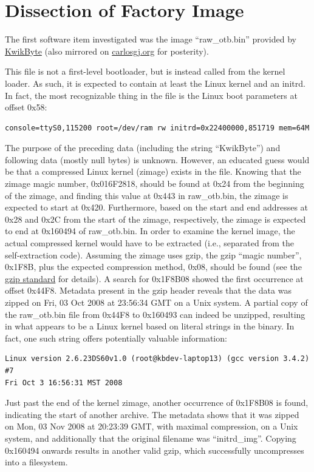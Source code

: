 \documentclass[]{article}
\begin{document}
\section{Dissection of Factory Image}
\par The first software item investigated was the image ``raw\_otb.bin'' provided by \href{http://www.kwikbyte.com/driverstation/binary/raw_otb.bin}{KwikByte} (also mirrored on \href{http://carlosgj.org/FRC/DS9260/raw_otb.bin}{carlosgj.org} for posterity).
\par This file is not a first-level bootloader, but is instead called from the kernel loader. As such, it is expected to contain at least the Linux kernel and an initrd. In fact, the most recognizable thing in the file is the Linux boot parameters at offset 0x58:
\begin{verbatim}
console=ttyS0,115200 root=/dev/ram rw initrd=0x22400000,851719 mem=64M
\end{verbatim}
\par The purpose of the preceding data (including the string ``KwikByte'') and following data (mostly null bytes) is unknown. However, an educated guess would be that a compressed Linux kernel (zimage) exists in the file. Knowing that the zimage magic number, 0x016F2818, should be found at 0x24 from the beginning of the zimage, and finding this value at 0x443 in raw\_otb.bin, the zimage is expected to start at 0x420. Furthermore, based on the start and end addresses at 0x28 and 0x2C from the start of the zimage, respectively, the zimage is expected to end at 0x160494 of raw\_otb.bin. In order to examine the kernel image, the actual compressed kernel would have to be extracted (i.e., separated from the self-extraction code). Assuming the zimage uses gzip, the gzip ``magic number'', 0x1F8B, plus the expected compression method, 0x08, should be found (see the \href{https://tools.ietf.org/html/rfc1952}{gzip standard} for details). A search for 0x1F8B08 showed the first occurrence at offset 0x44F8. Metadata present in the gzip header reveals that the data was zipped on Fri, 03 Oct 2008 at 23:56:34 GMT on a Unix system. A partial copy of the raw\_otb.bin file from 0x44F8 to 0x160493 can indeed be unzipped, resulting in what appears to be a Linux kernel based on literal strings in the binary. In fact, one such string offers potentially valuable information:
\begin{verbatim}
Linux version 2.6.23DS60v1.0 (root@kbdev-laptop13) (gcc version 3.4.2) #7 
Fri Oct 3 16:56:31 MST 2008
\end{verbatim}
\par Just past the end of the kernel zimage, another occurrence of 0x1F8B08 is found, indicating the start of another archive. The metadata shows that it was zipped on Mon, 03 Nov 2008 at 20:23:39 GMT, with maximal compression, on a Unix system, and additionally that the original filename was ``initrd\_img''. Copying 0x160494 onwards results in another valid gzip, which successfully uncompresses into a filesystem.
\end{document}
